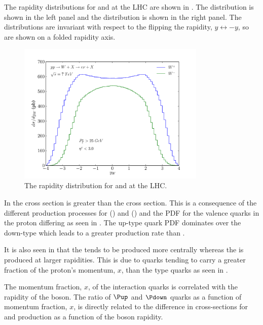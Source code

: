 The rapidity distributions for \PWp and \PWm at the \ac{LHC} are shown in
. 
The \PWm distribution is shown in the left panel and the \PWp distribution is
shown in the right panel. The distributions are invariant with respect to the
flipping the rapidity, $y\leftrightarrow-y$, so are shown on a folded rapidity
axis.

\begin{figure}[htbp]
  \centering
  \includegraphics[width=0.8\textwidth]{w-rapidity}
  \caption{The rapidity distribution for \PWp and \PWm at the LHC.}
  \label{wbos:wrapid}
\end{figure}

In  the \PWp cross section is greater than the \PWm
cross section. This is a consequence of the different production processes for
\PWp () and \PWm () and the
\ac{PDF} for the valence quarks in the proton differing as seen in
. The up-type quark \ac{PDF} dominates over the
down-type which leads to a greater \PWp production rate than \PWm.

It is also seen in  that the \PWm tends to be produced
more centrally whereas the \PWp is produced at larger rapidities. This is due
to \Pup quarks tending to carry a greater fraction of the proton's momentum,
$x$, than the \Pdown type quarks as seen in .

The momentum fraction, $x$, of the interaction quarks is correlated
with the rapidity of the \PW boson. The ratio of $\Pup$ and $\Pdown$ quarks as
a function of momentum fraction, $x$, is directly related to the difference in
cross-sections for \PWp and \PWm production as a function of the boson
rapidity.

